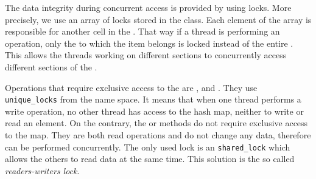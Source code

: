         
        The data integrity during concurrent access is provided by using locks. 
        More precisely, we use an array of locks stored in the \NvmHashMap class.
        Each element of the array is responsible for another cell in the \internalHashMap.
        That way if a thread is performing an operation, only the \internalHashMap to which the item belongs is locked instead of the entire \NvmHashMap. 
        This allows the threads working on different sections to concurrently access different sections of the \NvmHashMap.  
        
        Operations that require exclusive access to the \internalHashMap are \insertMethod, \removeMethod and \expandMethod.
        They use \texttt{unique\_locks} \cite{UniqueLock} from the \std name space.
        It means that when one thread performs a write operation, no other thread has access to the hash map, neither to write or read an element. 
        On the contrary, the \getMethod or \iterateMethod methods do not require exclusive access to the map. 
        They are both read operations and do not change any data, therefore can be performed concurrently.
        The only used lock is an \std \texttt{shared\_lock} \cite{SharedLock} which allows the others to read data at the same time. 
        This solution is the so called \textit{readers-writers lock}. 
        
